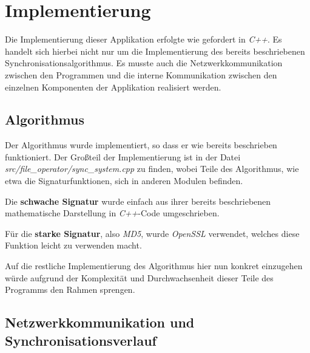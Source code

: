 \section{Implementierung}

Die Implementierung dieser Applikation erfolgte wie gefordert in \textsl{C++}. Es handelt sich hierbei nicht nur um die Implementierung des bereits beschriebenen
Synchronisationsalgorithmus. Es musste auch die Netzwerkkommunikation zwischen den Programmen und die interne Kommunikation zwischen den einzelnen Komponenten
der Applikation realisiert werden.

\subsection{Algorithmus}

Der Algorithmus wurde implementiert, so dass er wie bereits beschrieben funktioniert. Der Großteil der Implementierung ist in der Datei 
\textit{src\slash file\_operator\slash sync\_system.cpp} zu finden, wobei Teile des Algorithmus, wie etwa die Signaturfunktionen, sich in anderen Modulen befinden.

Die \textbf{schwache Signatur} wurde einfach aus ihrer bereits beschriebenen mathematische Darstellung in \textsl{C++}-Code umgeschrieben. 

Für die \textbf{starke Signatur}, also \textit{MD5}, wurde \textit{OpenSSL} verwendet, welches diese Funktion leicht zu verwenden macht\cite{openssl}.

Auf die restliche Implementierung des Algorithmus hier nun konkret einzugehen würde aufgrund der Komplexität und Durchwachsenheit dieser Teile des Programms den Rahmen sprengen.

\subsection{Netzwerkkommunikation und Synchronisationsverlauf}

